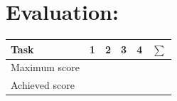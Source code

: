 \section*{\hspace*{2mm}Evaluation:}
\begin{center}
    \begin{tabular}{p{4cm}P{1.0cm}P{1.0cm}P{1.0cm}P{1.0cm}P{1.0cm}}
        \toprule
        Task           & 1                   & 2                   & 3                   & 4                   & $\sum$                                                                                              \\
        \midrule
        Maximum score  &  &  &  &  &  \\
        Achieved score &                                                                                                                                                                                             \\
        \bottomrule
    \end{tabular}
\end{center}